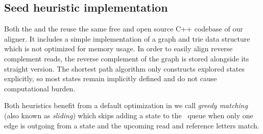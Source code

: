 \subsection{Seed heuristic implementation}

Both the \seedh and the \prefixh reuse the same free and open source C++
codebase of our \astarix aligner. It includes a simple implementation of a graph
and trie data structure which is not optimized for memory usage. In order to
easily align reverse complement reads, the reverse complement of the graph is
stored alongside its straight version. The shortest path algorithm only
constructs explored states explicitly, so most states remain implicitly defined
and do not cause computational burden.

Both heuristics benefit from a default optimization in \astarix we call
\emph{greedy matching} (also known as \emph{sliding}) which skips adding a state
to the \A~queue when only one edge is outgoing from a state and the upcoming
read and reference letters match.